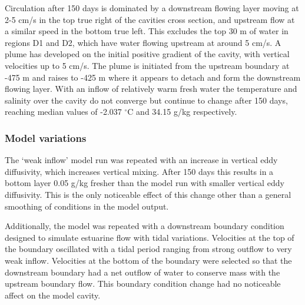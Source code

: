 Circulation after 150 days is dominated by a downstream flowing layer moving at 2-5 cm/s in the top true right of the cavities cross section, and upstream flow at a similar speed in the bottom true left.  This excludes the top 30 m of water in regions D1 and D2, which have water flowing upstream at around 5 cm/s. 
A plume has developed on the initial positive gradient of the cavity, with vertical velocities up to 5 cm/s. The plume is initiated from the upstream boundary at -475 m and raises to -425 m where it appears to detach and form the downstream flowing layer.
With an inflow of relatively warm fresh  water the temperature and salinity over the cavity do not converge but continue to change after 150 days, reaching median values of -2.037 $^{\circ}$C and 34.15 g/kg respectively.

\subsubsection{Model variations}
The `weak inflow' model run was repeated with an increase in vertical eddy diffusivity, which increases vertical mixing. After 150 days this results in a bottom layer 0.05  g/kg fresher than the model run with smaller vertical eddy diffusivity. This is the only noticeable effect of this change other than a general smoothing of conditions in the model output. 

Additionally, the model was repeated with a downstream boundary condition designed to simulate estuarine flow with tidal variations. Velocities at the top of the boundary oscillated with a tidal period ranging from strong outflow to very weak inflow. Velocities at the bottom of the boundary were selected so that the downstream boundary had a net outflow of water to conserve mass with the upstream boundary flow. This boundary condition change had no noticeable affect on the model cavity.

